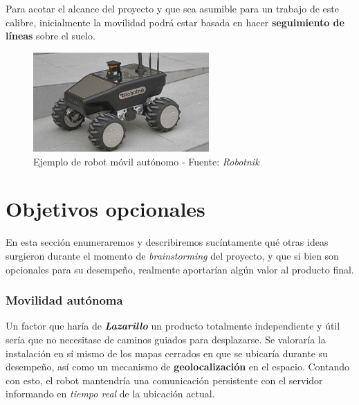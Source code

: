 Para acotar el alcance del proyecto y que sea asumible para un trabajo de este calibre, inicialmente la movilidad podrá estar basada en hacer \textbf{seguimiento de líneas} sobre el suelo.\\

\begin{figure}[h]
	\centering
	\includegraphics[width=0.6\textwidth]{imagenes/robotnik.jpg}
	\caption{Ejemplo de robot móvil autónomo - Fuente: \textit{Robotnik}}
	\label{robotnik}
\end{figure}


\section{Objetivos opcionales}

En esta sección enumeraremos y describiremos sucíntamente qué otras ideas surgieron durante el momento de \textit{brainstorming} del proyecto, y que si bien son opcionales para su desempeño, realmente aportarían algún valor al producto final.\\


\subsubsection{Movilidad autónoma}

Un factor que haría de \textbf{\textit{Lazarillo}} un producto totalmente independiente y útil sería que no necesitase de caminos guiados para desplazarse. Se valoraría la instalación en sí mismo de los mapas cerrados en que se ubicaría durante su desempeño, así como un mecanismo de \textbf{geolocalización} en el espacio. Contando con esto, el robot mantendría una comunicación persistente con el servidor informando en \textit{tiempo real} de la ubicación actual.\\





